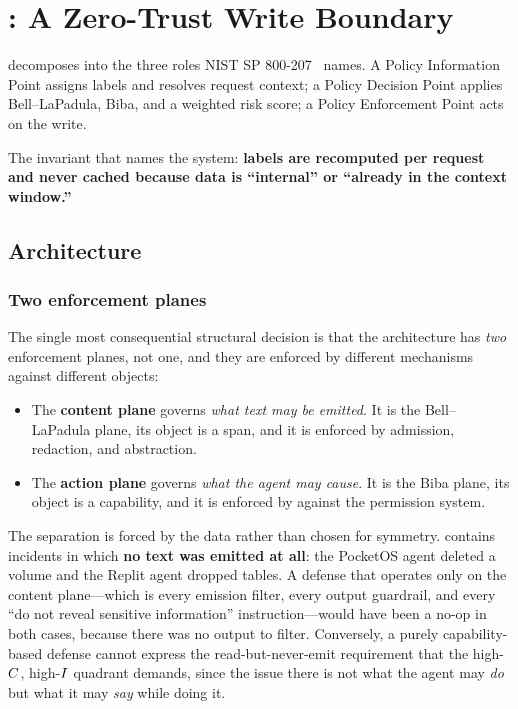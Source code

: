 \section{\sys: A Zero-Trust Write Boundary}
\label{sec:method}

\sys{} decomposes into the three roles NIST SP 800-207~\cite{nist800207} names.
A Policy Information Point assigns labels and resolves request context; a
Policy Decision Point applies Bell--LaPadula, Biba, and a weighted risk score;
a Policy Enforcement Point acts on the write.

The invariant that names the system: \textbf{labels are recomputed per request
and never cached because data is ``internal'' or ``already in the context
window.''}

\subsection{Architecture}
\label{sec:method:arch}

\subsubsection{Two enforcement planes}
\label{sec:method:planes}

The single most consequential structural decision is that the architecture has
\emph{two} enforcement planes, not one, and they are enforced by different
mechanisms against different objects:

\begin{itemize}
  \item The \textbf{content plane} governs \emph{what text may be emitted}. It
  is the Bell--LaPadula plane, its object is a span, and it is enforced by
  admission, redaction, and abstraction.
  \item The \textbf{action plane} governs \emph{what the agent may cause}. It
  is the Biba plane, its object is a capability, and it is enforced by
   against the permission system.
\end{itemize}

The separation is forced by the data rather than chosen for symmetry.
 contains incidents in which \textbf{no text was emitted at
all}: the PocketOS agent deleted a volume and the Replit agent dropped tables.
A defense that operates only on the content plane---which is every emission
filter, every output guardrail, and every ``do not reveal sensitive
information'' instruction---would have been a no-op in both cases, because
there was no output to filter. Conversely, a purely capability-based defense
cannot express the read-but-never-emit requirement that the high-$C$,
high-$I$ quadrant demands, since the issue there is not what the agent may
\emph{do} but what it may \emph{say} while doing it.

